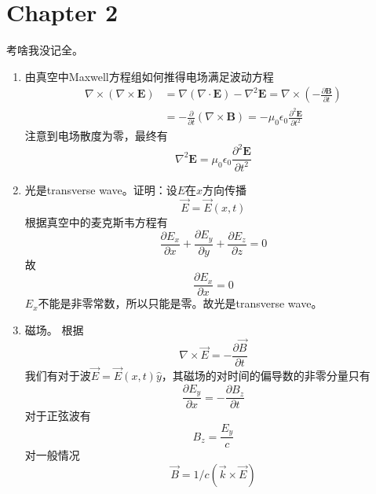 \documentclass{ctexart}
\begin{document}
\section{Chapter 2}
考啥我没记全。\\
\begin{enumerate}
\item 由真空中Maxwell方程组如何推得电场满足波动方程
\begin{equation}
\begin{aligned} \nabla \times(\nabla \times \mathbf{E}) &=\nabla(\nabla \cdot \mathbf{E})-\nabla^{2} \mathbf{E}=\nabla \times\left(-\frac{\partial \mathbf{B}}{\partial t}\right) \\ &=-\frac{\partial}{\partial t}(\nabla \times \mathbf{B})=-\mu_{0} \epsilon_{0} \frac{\partial^{2} \mathbf{E}}{\partial t^{2}} \end{aligned}
\end{equation}
注意到电场散度为零，最终有
\begin{equation}
\nabla^{2} \mathbf{E}=\mu_{0} \epsilon_{0} \frac{\partial^{2} \mathbf{E}}{\partial t^{2}}
\end{equation}

\item 光是transverse wave。证明：设$E$在$x$方向传播
\begin{equation}
\vec{E}=\vec{E}(x, t)
\end{equation}
根据真空中的麦克斯韦方程有
\begin{equation}
\frac{\partial E_{x}}{\partial x}+\frac{\partial E_{y}}{\partial y}+\frac{\partial E_{z}}{\partial z}=0
\end{equation}
故
\begin{equation}
\frac{\partial E_{x}}{\partial x}=0
\end{equation}
$E_x$不能是非零常数，所以只能是零。故光是transverse wave。
\item 磁场。 根据
\begin{equation}
\nabla \times \vec{E}=-\frac{\partial \vec{B}}{\partial t}
\end{equation}
我们有对于波$\vec{E}=\vec{E}(x, t)\hat{y}$，其磁场的对时间的偏导数的非零分量只有
\begin{equation}
\frac{\partial E_{y}}{\partial x}=-\frac{\partial B_{z}}{\partial t}
\end{equation}
对于正弦波有
\begin{equation}
B_z=\frac{E_y}{c}
\end{equation}
对一般情况
\begin{equation}
\vec{B}=1/c ( \vec{k} × \vec{E})
\end{equation}


\end{enumerate}
\end{document}
